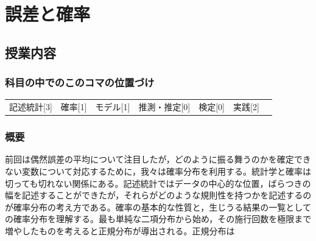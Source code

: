 \section{誤差と確率}
\label{s07_probability}

\subsection{授業内容}
\subsubsection{科目の中でのこのコマの位置づけ}
\begin{tabular}[t]{ccccccc}
	記述統計[3] & 確率[1] & モデル[1] & 推測・推定[0] & 検定[0] & 実践[2]
\end{tabular}
\subsubsection{概要}
前回は偶然誤差の平均について注目したが，どのように振る舞うのかを確定できない変数について対応するために，我々は確率分布を利用する。統計学と確率は切っても切れない関係にある。記述統計ではデータの中心的な位置，ばらつきの幅を記述することができたが，それらがどのような規則性を持つかを記述するのが確率分布の考え方である。確率の基本的な性質と，生じうる結果の一覧としての確率分布を理解する。最も単純な二項分布から始め，その施行回数を極限まで増やしたものを考えると正規分布が導出される。正規分布は
